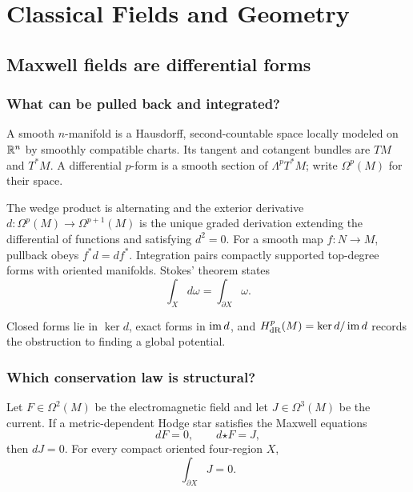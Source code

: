 \part{Classical Fields and Geometry}

\chapter{Maxwell fields are differential forms}
\label{ch:forms}



\section{What can be pulled back and integrated?}

A smooth $n$-manifold is a Hausdorff, second-countable space locally modeled
on $\mathbb R^n$ by smoothly compatible charts.  Its tangent and cotangent bundles
are $TM$ and $T^*M$.  A differential $p$-form is a smooth section of
$\Lambda^pT^*M$; write $\Omega^p(M)$ for their space.

The wedge product is alternating and the exterior derivative
$d:\Omega^p(M)\to\Omega^{p+1}(M)$ is the unique graded derivation extending
the differential of functions and satisfying $d^2=0$.  For a smooth map
$f:N\to M$, pullback obeys $f^*d=df^*$.  Integration pairs compactly
supported top-degree forms with oriented manifolds.  Stokes' theorem states
\[
\int_Xd\omega=\int_{\partial X}\omega.
\]

Closed forms lie in $\ker d$, exact forms in $\operatorname{im} d$, and
$H^p_{\mathrm{dR}}(M)=\ker d/\operatorname{im} d$ records the obstruction to finding a
global potential.

\section{Which conservation law is structural?}

\begin{theorem}
Let $F\in\Omega^2(M)$ be the electromagnetic field and let
$J\in\Omega^3(M)$ be the current.  If a metric-dependent Hodge star satisfies
the Maxwell equations
\[
dF=0,\qquad d{\star F}=J,
\]
then $dJ=0$.  For every compact oriented four-region $X$,
\[
\int_{\partial X}J=0.
\]
\end{theorem}


